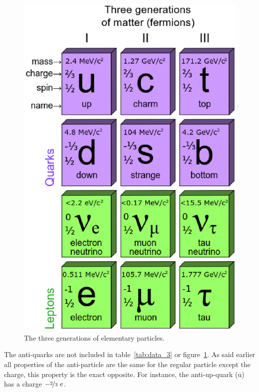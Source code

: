 \documentclass[12pt,a4paper]{article}
\numberwithin{equation}{section}
\numberwithin{figure}{section}
\numberwithin{table}{section}
\begin{document}
\begin{figure}[h]\begin{center}
\includegraphics[scale=0.62]{particles.eps}%
\caption{The three generations of elementary particles.\protect\footnotemark}\label{fig:particles}
\end{center}\end{figure}

The anti-quarks are not included in table~\ref{tab:data_3} or figure~\ref{fig:particles}. As said earlier all properties of the anti-particle are the same for the regular particle except the charge, this property is the exact opposite. For instance, the anti-up-quark ($\overline{\mbox{u}}$) has a charge $-\nicefrac{2}{3}~e$.
\end{document}
